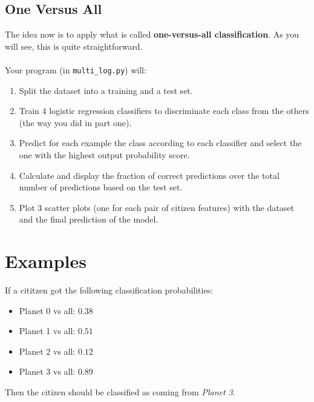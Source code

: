 \subsection*{One Versus All}
The idea now is to apply what is called \textbf{one-versus-all classification}. 
As you will see, this is quite straightforward.\\
\\
Your program (in \texttt{multi\_log.py}) will:
\begin{enumerate}
  \item Split the dataset into a training and a test set.
  \item Train 4 logistic regression classifiers to discriminate each class 
  from the others (the way you did in part one).
  \item Predict for each example the class according to each classifier and
   select the one with the highest output probability score.
  \item Calculate and display the fraction of correct predictions over the 
  total number of predictions based on the test set.
  \item Plot 3 scatter plots (one for each pair of citizen features) with the
   dataset and the final prediction of the model.
\end{enumerate}

\section*{Examples}
If a cititzen got the following classification probabilities: 
\begin{itemize}
  \item Planet 0 vs all: $0.38$
  \item Planet 1 vs all: $0.51$
  \item Planet 2 vs all: $0.12$
  \item Planet 3 vs all: $0.89$
\end{itemize}

Then the citizen should be classified as coming from \textit{Planet 3}. 